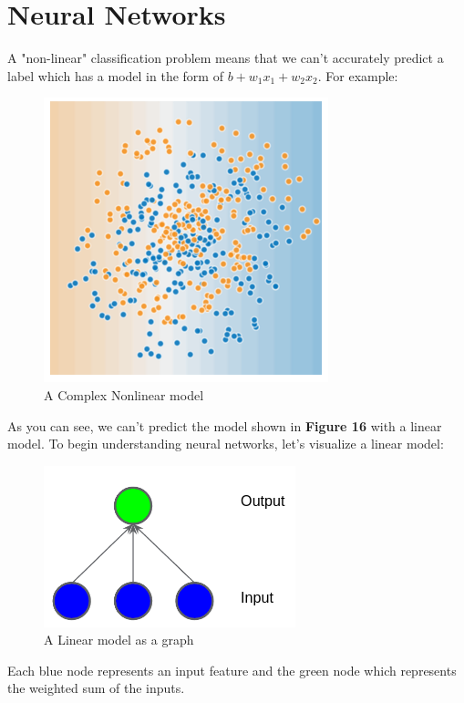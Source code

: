 \documentclass[12pt]{article}
\begin{document}
\section{Neural Networks}
A "non-linear" classification problem means that we can't accurately predict a label which has a model in the form of $b + w_1x_1 + w_2x_2$. For example:
\begin{figure}[H]
	\includegraphics[scale = 0.5]{imgs/NonlinearComplex.png}
	\centering
	\caption{A Complex Nonlinear model}
\end{figure}
As you can see, we can't predict the model shown in \textbf{Figure 16} with a linear model. 
To begin understanding neural networks, let's visualize a linear model:
\begin{figure}[H]
	\includegraphics[scale = 0.5]{imgs/LinearGraph.png}
	\centering
	\caption{A Linear model as a graph}
\end{figure}
Each blue node represents an input feature and the green node which represents the weighted sum of the inputs.
\end{document}
